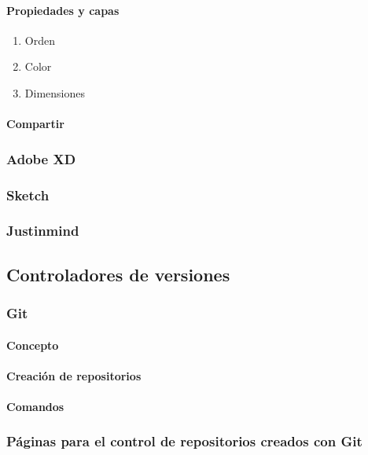 \documentclass[12pt]{report}
\begin{document}
				\paragraph{Propiedades y capas}
					\begin{enumerate}
						\item Orden
						\item Color
						\item Dimensiones
					\end{enumerate}
				\paragraph{Compartir}
			\subsubsection{Adobe XD}
			\subsubsection{Sketch}
			\subsubsection{Justinmind}
		\subsection{Controladores de versiones}
			\subsubsection{Git}
				\paragraph{Concepto}
				\paragraph{Creación de repositorios}
				\paragraph{Comandos}
			\subsubsection{Páginas para el control de repositorios creados con Git}
\end{document}
